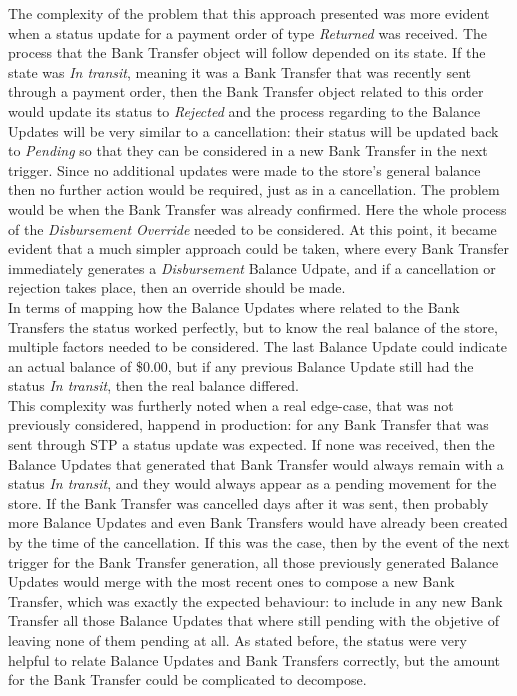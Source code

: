 The complexity of the problem that this approach presented was more evident when a status update for a payment order of type \textit{Returned} was received. The process that the Bank Transfer object will follow depended on its state. If the state was \textit{In transit}, meaning it was a Bank Transfer that was recently sent through a payment order, then the Bank Transfer object related to this order would update its status to \textit{Rejected} and the process regarding to the Balance Updates will be very similar to a cancellation: their status will be updated back to \textit{Pending} so that they can be considered in a new Bank Transfer in the next trigger. Since no additional updates were made to the store’s general balance then no further action would be required, just as in a cancellation. The problem would be when the Bank Transfer was already confirmed. Here the whole process of the \textit{Disbursement Override} needed to be considered. At this point, it became evident that a much simpler approach could be taken, where every Bank Transfer immediately generates a \textit{Disbursement} Balance Udpate, and if a cancellation or rejection takes place, then an override should be made.\\

In terms of mapping how the Balance Updates where related to the Bank Transfers the status worked perfectly, but to know the real balance of the store, multiple factors needed to be considered. The last Balance Update could indicate an actual balance of \$0.00, but if any previous Balance Update still had the status \textit{In transit}, then the real balance differed.\\ 

This complexity was furtherly noted when a real edge-case, that was not previously considered, happend in production: for any Bank Transfer that was sent through STP a status update was expected. If none was received, then the Balance Updates that generated that Bank Transfer would always remain with a status \textit{In transit}, and they would always appear as a pending movement for the store. If the Bank Transfer was cancelled days after it was sent, then probably more Balance Updates and even Bank Transfers would have already been created by the time of the cancellation. If this was the case, then by the event of the next trigger for the Bank Transfer generation, all those previously generated Balance Updates would merge with the most recent ones to compose a new Bank Transfer, which was exactly the expected behaviour: to include in any new Bank Transfer all those Balance Updates that where still pending with the objetive of leaving none of them pending at all. As stated before, the status were very helpful to relate Balance Updates and Bank Transfers correctly, but the amount for the Bank Transfer could be complicated to decompose.\\


